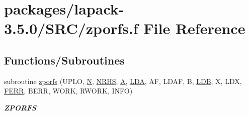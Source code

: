 \hypertarget{zporfs_8f}{}\section{packages/lapack-\/3.5.0/\+S\+R\+C/zporfs.f File Reference}
\label{zporfs_8f}
\subsection*{Functions/\+Subroutines}
\begin{DoxyCompactItemize}
\item 
subroutine \hyperlink{group__complex16POcomputational_gaec0aef3e740643130c8f453104fb97d0}{zporfs} (U\+P\+L\+O, \hyperlink{polmisc_8c_a0240ac851181b84ac374872dc5434ee4}{N}, \hyperlink{example__user_8c_aa0138da002ce2a90360df2f521eb3198}{N\+R\+H\+S}, \hyperlink{classA}{A}, \hyperlink{example__user_8c_ae946da542ce0db94dced19b2ecefd1aa}{L\+D\+A}, A\+F, L\+D\+A\+F, B, \hyperlink{example__user_8c_a50e90a7104df172b5a89a06c47fcca04}{L\+D\+B}, X, L\+D\+X, \hyperlink{superlu__enum__consts_8h_af00a42ecad444bbda75cde1b64bd7e72a78fd14d7abebae04095cfbe02928f153}{F\+E\+R\+R}, B\+E\+R\+R, W\+O\+R\+K, R\+W\+O\+R\+K, I\+N\+F\+O)
\begin{DoxyCompactList}\small\item\em {\bfseries Z\+P\+O\+R\+F\+S} \end{DoxyCompactList}\end{DoxyCompactItemize}
